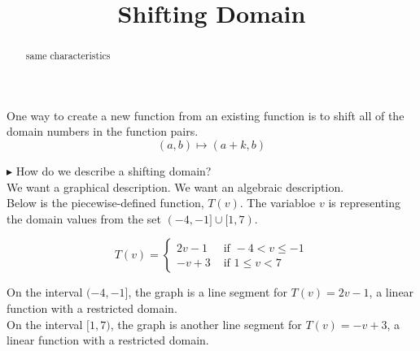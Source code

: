 \documentclass{ximera}
\title{Shifting Domain}
\begin{document}
\begin{abstract}
same characteristics
\end{abstract}
\maketitle








One way to create a new function from an existing function is to shift all of the domain numbers in the function pairs. \\

\[
(a, b) \mapsto (a + k, b)
\]



\textbf{\textcolor{blue!55!black}{$\blacktriangleright$}} How do we describe a shifting domain? \\

We want a graphical description. We want an algebraic description. \\




Below is the piecewise-defined function, $T(v)$.  The variabloe $v$ is representing the domain values from the set $(-4,-1] \cup [1,7)$.




\[
T(v) = 
\begin{cases}
  2v-1 & \text{ if }  -4 < v \leq -1 \\
  -v+3 & \text{ if } 1 \leq v < 7
\end{cases}
\]


On the interval $(-4, -1]$, the graph is a line segment for $T(v) = 2v-1$, a linear function with a restricted domain. \\



On the interval $[1, 7)$, the graph is another line segment for $T(v) = -v+3$, a linear function with a restricted domain. \\
\end{document}
